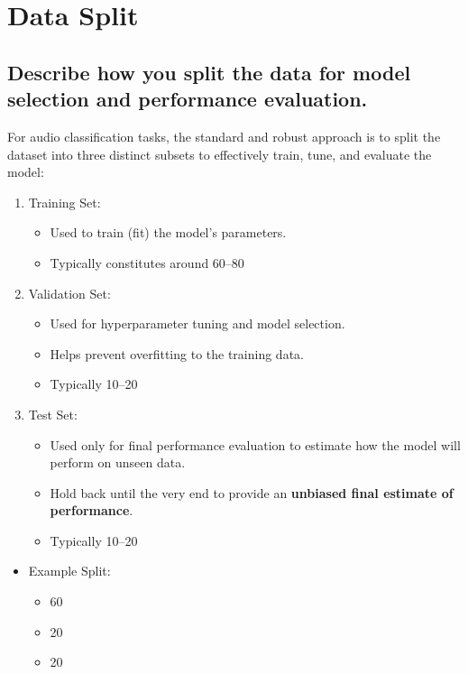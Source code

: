 
\section{Data Split} 
\label{sec:Data Split}




\subsection{Describe how you split the data for model selection and performance evaluation. }
\label{sec:Data Split:a}

For audio classification tasks, the standard and robust approach is to split the dataset into three distinct subsets to effectively train, tune, and evaluate the model:


\begin{enumerate}
	\item Training Set:
	\begin{itemize}
		\item Used to train (fit) the model's parameters.
		\item Typically constitutes around 60–80%
	\end{itemize}
	
	\item Validation Set:
	\begin{itemize}
		\item Used for hyperparameter tuning and model selection.
		\item Helps prevent overfitting to the training data.
		\item Typically 10–20%
	\end{itemize}

	\item Test Set:
	\begin{itemize}
		\item Used only for final performance evaluation to estimate how the model will perform on unseen data.
		\item Hold back until the very end to provide an {\bf unbiased final estimate of performance}.
		\item Typically 10–20%
	\end{itemize}
\end{enumerate}

\begin{itemize}
	\item Example Split:
	\begin{itemize}
		\item 60%
		\item 20%
		\item 20%
	\end{itemize}
\end{itemize}

